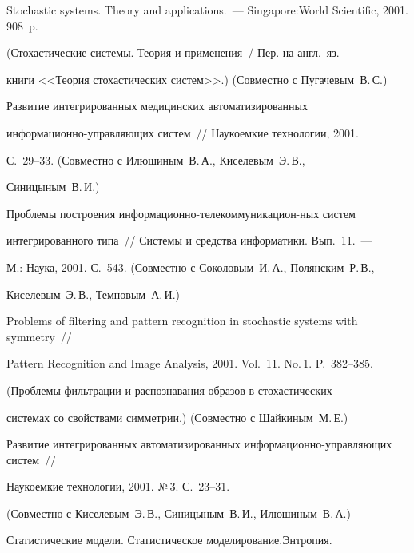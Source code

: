 Stochastic systems. Theory and applications.~--- Singapore:\linebreak World Scientific, 2001. 908~p.


(Стохастические системы. Теория и применения~/ Пер. на англ.\ яз.\


книги <<Теория стохастических систем>>.) (Совместно с Пугачевым~В.\,С.)





 Развитие интегрированных медицинских автоматизированных


информационно-управляющих систем~// Наукоемкие технологии, 2001.


С.~29--33. (Совместно с Илюшиным~В.\,А., Киселевым~Э.\,В.,


Синицыным~В.\,И.)





 Проблемы построения информационно-те\-ле\-ком\-му\-ни\-ка\-ци\-он-\linebreak ных сис\-тем


интегрированного типа~// Системы и средства информатики. Вып.~11.~---


М.: Наука, 2001. С.~543. (Совместно с Соколовым~И.\,А., Полянским~Р.\,В.,


Киселевым~Э.\,В., Темновым~А.\,И.)





Problems of filtering and pattern recognition in stochastic systems with symmetry~//


Pattern Recognition and Image Analysis, 2001. Vol.~11. No.\,1. P.~382--385.


(Проблемы фильтрации и распознавания образов в стохастических


системах со свойствами симметрии.) (Совместно с Шайкиным~М.\,Е.)





 Развитие интегрированных автоматизированных ин\-фор\-ма\-ци\-он\-но-управ\-ля\-ющих систем~//


 Наукоемкие технологии, 2001. №\,3. С.~23--31.


(Совместно с Киселевым~Э.\,В., Синицыным~В.\,И., Илюшиным~В.\,А.)










 Статистические модели. Статистическое моделирование.\linebreak Энтропия.


